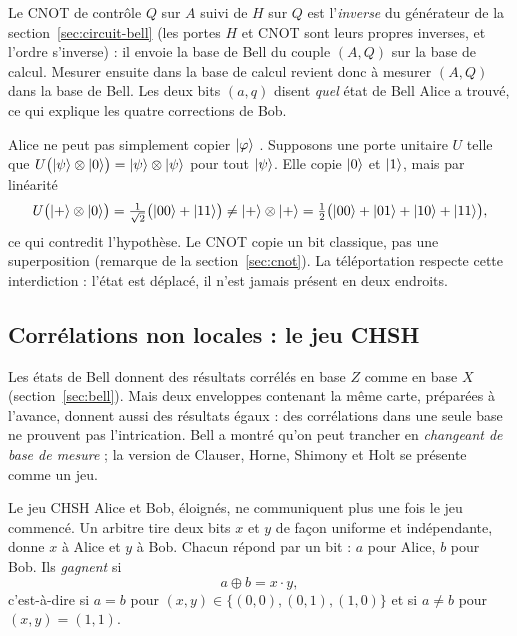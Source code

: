 \begin{remarque}
Le CNOT de contrôle $Q$ sur $A$ suivi de $H$ sur $Q$ est l'\emph{inverse} du générateur de la
section~\ref{sec:circuit-bell} (les portes $H$ et CNOT sont leurs propres inverses, et l'ordre
s'inverse) : il envoie la base de Bell du couple $(A,Q)$ sur la base de calcul. Mesurer ensuite dans
la base de calcul revient donc à mesurer $(A,Q)$ dans la base de Bell. Les deux bits $(a,q)$
disent \emph{quel} état de Bell Alice a trouvé, ce qui explique les quatre corrections de Bob.
\end{remarque}

\begin{remarque}
Alice ne peut pas simplement copier $|\varphi\rangle$ \parencite{wootters1982}. Supposons une porte
unitaire $U$ telle que $U\big(|\psi\rangle\otimes|0\rangle\big)=|\psi\rangle\otimes|\psi\rangle$ pour tout
$|\psi\rangle$. Elle copie $|0\rangle$ et $|1\rangle$, mais par linéarité
\[
  U\big(|+\rangle\otimes|0\rangle\big)=\tfrac{1}{\sqrt2}\big(|00\rangle+|11\rangle\big)
  \neq|+\rangle\otimes|+\rangle=\tfrac12\big(|00\rangle+|01\rangle+|10\rangle+|11\rangle\big),
\]
ce qui contredit l'hypothèse. Le CNOT copie un bit classique, pas une superposition (remarque de la
section~\ref{sec:cnot}). La téléportation respecte cette interdiction : l'état est déplacé, il n'est
jamais présent en deux endroits.
\end{remarque}

\subsection{Corrélations non locales : le jeu CHSH}\label{sec:chsh}

Les états de Bell donnent des résultats corrélés en base $Z$ comme en base $X$
(section~\ref{sec:bell}). Mais deux enveloppes contenant la même carte, préparées à l'avance, donnent
aussi des résultats égaux : des corrélations dans une seule base ne prouvent pas l'intrication. Bell
\parencite{bell1964} a montré qu'on peut trancher en \emph{changeant de base de mesure} ; la version de
Clauser, Horne, Shimony et Holt \parencite{clauser1969} se présente comme un jeu.

\begin{definition}{Le jeu CHSH}
Alice et Bob, éloignés, ne communiquent plus une fois le jeu commencé. Un arbitre tire deux bits $x$ et
$y$ de façon uniforme et indépendante, donne $x$ à Alice et $y$ à Bob. Chacun répond par un bit : $a$ pour
Alice, $b$ pour Bob. Ils \emph{gagnent} si
\[
  a\oplus b=x\cdot y,
\]
c'est-à-dire si $a=b$ pour $(x,y)\in\{(0,0),(0,1),(1,0)\}$ et si $a\neq b$ pour $(x,y)=(1,1)$.
\end{definition}

